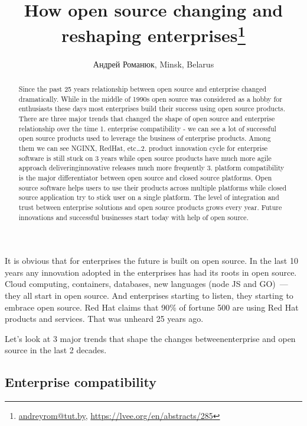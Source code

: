 \documentclass[10pt, a5paper]{article}
\begin{document}
\title{How open source changing and reshaping enterprises\footnote{\url{andreyrom@tut.by}, \url{https://lvee.org/en/abstracts/285}}}
\author{Андрей Романюк, Minsk, Belarus}
\maketitle
\begin{abstract}
Since the past 25 years relationship between open source and enterprise changed dramatically. While in the middle of 1990s open source was considered as a hobby for enthusiasts these days most enterprises build their success using open source products. There are three major trends that changed the shape of open source and enterprise relationship over the time 1. enterprise compatibility - we can see a lot of successful open source products used to leverage the business of enterprise products. Among them we can see NGINX, RedHat, etc\ldots 2. product innovation cycle for enterprise software is still stuck on 3 years while open source products have much more agile approach delivering\linebreak innovative releases much more frequently 3. platform compatibility is the major differentiator between open source and closed source platforms. Open source software helps users to use their products across multiple platforms while closed source application try to stick user on a single platform. The level of integration and trust between enterprise solutions and open source products grows every year. Future innovations and successful businesses start today with help of open source.
\end{abstract}

It is obvious that for enterprises the future is built on open source. In the last 10 years any innovation adopted in the enterprises has had its roots in open source. Cloud computing, containers, databases, new languages (node JS and GO)~--- they all start in open source. And enterprises starting to listen, they starting to embrace open source. Red Hat claims that 90\% of fortune 500 are using Red Hat products and services. That was unheard 25 years ago.

Let’s look at 3 major trends that shape the changes between\linebreak enterprise and open source in the last 2 decades.

\subsection*{Enterprise compatibility}
\end{document}
